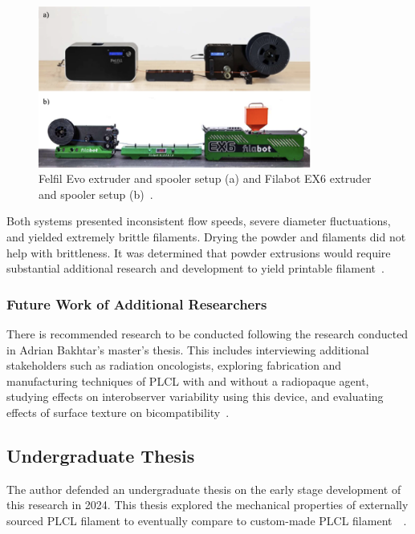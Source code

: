 \begin{figure}[h!]
        \centering
        \includegraphics[width=0.8\textwidth]{../figs/introduction/felfil_and_filabot_extruders.png}
        \caption{Felfil Evo extruder and spooler setup (a) and Filabot EX6 extruder and spooler setup (b)~\cite{RefWorks:RefID:371-bakhtardesign}.}
        \label{fig:introduction:felfilAndFilabotExtruders}
\end{figure}

Both systems presented inconsistent flow speeds, severe diameter fluctuations, and yielded extremely brittle filaments. Drying the powder and filaments did not help with brittleness. It was determined that powder extrusions would require substantial additional research and development to yield printable filament~\cite{RefWorks:RefID:371-bakhtardesign}.

\subsubsection{Future Work of Additional Researchers\label{sec:introduction:priorWork:futureWork}}

There is recommended research to be conducted following the research conducted in Adrian Bakhtar's master's thesis. This includes interviewing additional stakeholders such as radiation oncologists, exploring fabrication and manufacturing techniques of PLCL with and without a radiopaque agent, studying effects on interobserver variability using this device, and evaluating effects of surface texture on bicompatibility~\cite{RefWorks:RefID:371-bakhtardesign}.

\subsection{Undergraduate Thesis\label{sec:introduction:priorWork:undergradThesis}}
The author defended an undergraduate thesis on the early stage development of this research in 2024. This thesis explored the mechanical properties of externally sourced PLCL filament to eventually compare to custom-made PLCL filament~\cite{RefWorks:RefID:370-einsteinisaac}~\cite{RefWorks:RefID:42-latticemedical}.

